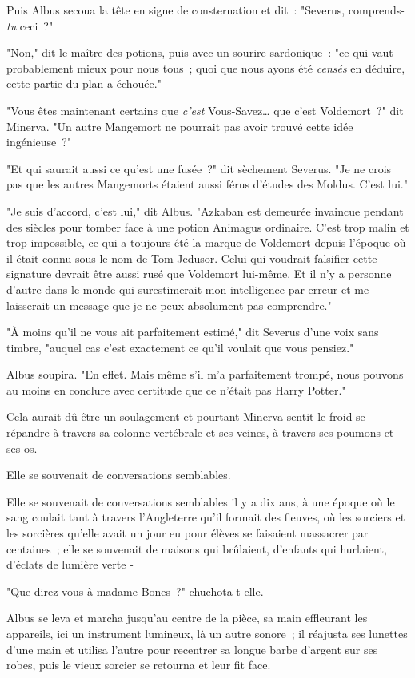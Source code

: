 Puis Albus secoua la tête en signe de consternation et dit~: "Severus, comprends-\emph{tu} ceci~?"

"Non," dit le maître des potions, puis avec un sourire sardonique~: "ce qui vaut probablement mieux pour nous tous~; quoi que nous ayons été \emph{censés} en déduire, cette partie du plan a échouée."

"Vous êtes maintenant certains que \emph{c'est} Vous-Savez… que c'est Voldemort~?" dit Minerva. "Un autre Mangemort ne pourrait pas avoir trouvé cette idée ingénieuse~?"

"Et qui saurait aussi ce qu'est une fusée~?" dit sèchement Severus. "Je ne crois pas que les autres Mangemorts étaient aussi férus d'études des Moldus. C'est lui."

"Je suis d'accord, c'est lui," dit Albus. "Azkaban est demeurée invaincue pendant des siècles pour tomber face à une potion Animagus ordinaire. C'est trop malin et trop impossible, ce qui a toujours été la marque de Voldemort depuis l'époque où il était connu sous le nom de Tom Jedusor. Celui qui voudrait falsifier cette signature devrait être aussi rusé que Voldemort lui-même. Et il n'y a personne d'autre dans le monde qui surestimerait mon intelligence par erreur et me laisserait un message que je ne peux absolument pas comprendre."

"À moins qu'il ne vous ait parfaitement estimé," dit Severus d'une voix sans timbre, "auquel cas c'est exactement ce qu'il voulait que vous pensiez."

Albus soupira. "En effet. Mais même s'il m'a parfaitement trompé, nous pouvons au moins en conclure avec certitude que ce n'était pas Harry Potter."

Cela aurait dû être un soulagement et pourtant Minerva sentit le froid se répandre à travers sa colonne vertébrale et ses veines, à travers ses poumons et ses os.

Elle se souvenait de conversations semblables.

Elle se souvenait de conversations semblables il y a dix ans, à une époque où le sang coulait tant à travers l'Angleterre qu'il formait des fleuves, où les sorciers et les sorcières qu'elle avait un jour eu pour élèves se faisaient massacrer par centaines~; elle se souvenait de maisons qui brûlaient, d'enfants qui hurlaient, d'éclats de lumière verte -

"Que direz-vous à madame Bones~?" chuchota-t-elle.

Albus se leva et marcha jusqu'au centre de la pièce, sa main effleurant les appareils, ici un instrument lumineux, là un autre sonore~; il réajusta ses lunettes d'une main et utilisa l'autre pour recentrer sa longue barbe d'argent sur ses robes, puis le vieux sorcier se retourna et leur fit face.

